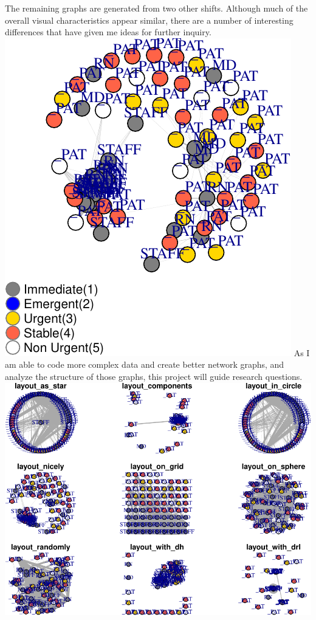 \documentclass[]{elsarticle} %
\makeatletter
\def\maxwidth{\ifdim\Gin@nat@width>\linewidth\linewidth
\else\Gin@nat@width\fi}
\let\Oldincludegraphics\includegraphics
\renewcommand{\includegraphics}[1]{\Oldincludegraphics[width=\maxwidth]{#1}}
\makeatother
\begin{document}
The remaining graphs are generated from two other shifts. Although much
of the overall visual characteristics appear similar, there are a number
of interesting differences that have given me ideas for further inquiry.
\includegraphics{Flynn_Project_files/figure-latex/shift 23-1.pdf} As I
am able to code more complex data and create better network graphs, and
analyze the structure of those graphs, this project will guide research
questions.
\includegraphics{Flynn_Project_files/figure-latex/shift23-1.pdf}
\end{document}
